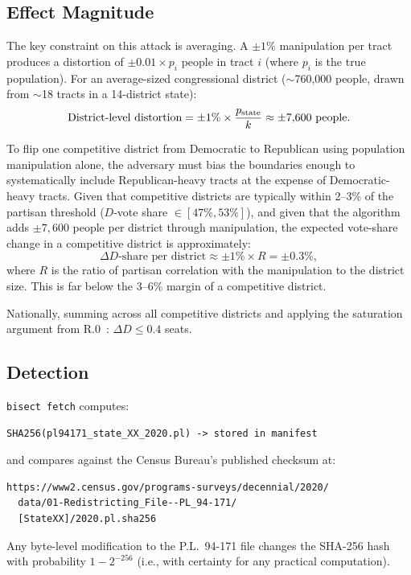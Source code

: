 \subsection{Effect Magnitude}

The key constraint on this attack is averaging.
A $\pm 1\%$ manipulation per tract produces a distortion of $\pm 0.01 \times
p_i$ people in tract $i$ (where $p_i$ is the true population).
For an average-sized congressional district ($\sim$760,000 people, drawn
from $\sim$18 tracts in a 14-district state):
\[
  \text{District-level distortion} = \pm 1\% \times \frac{p_{\rm state}}{k}
  \approx \pm 7{,}600 \text{ people}.
\]

To flip one competitive district from Democratic to Republican using
population manipulation alone, the adversary must bias the boundaries
enough to systematically include Republican-heavy tracts at the expense
of Democratic-heavy tracts.
Given that competitive districts are typically within 2--3\% of the
partisan threshold ($D$-vote share $\in [47\%, 53\%]$), and given that
the algorithm adds $\pm 7{,}600$ people per district through manipulation,
the expected vote-share change in a competitive district is approximately:
\[
  \Delta D\text{-share per district} \approx \pm 1\% \times R = \pm 0.3\%,
\]
where $R$ is the ratio of partisan correlation with the manipulation to
the district size.
This is far below the 3--6\% margin of a competitive district.

Nationally, summing across all competitive districts and applying the
saturation argument from R.0~\citep{r0paper}: $\Delta D \leq 0.4$ seats.

\subsection{Detection}

\texttt{bisect fetch} computes:
\begin{verbatim}
SHA256(pl94171_state_XX_2020.pl) -> stored in manifest
\end{verbatim}
and compares against the Census Bureau's published checksum at:
\begin{verbatim}
https://www2.census.gov/programs-surveys/decennial/2020/
  data/01-Redistricting_File--PL_94-171/
  [StateXX]/2020.pl.sha256
\end{verbatim}

Any byte-level modification to the P.L.\ 94-171 file changes the SHA-256
hash with probability $1 - 2^{-256}$ (i.e., with certainty for any
practical computation).
